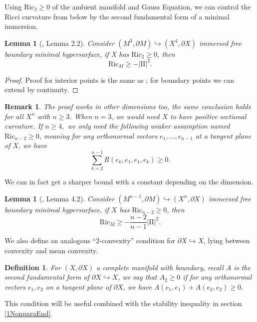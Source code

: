 \documentclass[12pt]{amsart}
\newcommand{\sff}{\mathrm{I\!I}}
\newcommand{\Ric}{\text{Ric}}
\newcommand{\p}{\partial}
\newtheorem{lemma}[theorem]{Lemma}
\newtheorem{definition}[theorem]{Definition}
\newtheorem{remark}[theorem]{Remark}
\numberwithin{equation}{section}
\begin{document}
	Using $\Ric_2 \geq 0$ of the ambient manifold and Gauss Equation, we can control the Ricci curvature from below by the second fundamental form of a minimal immersion.
	\begin{lemma}[\cite{ChodoLiStryk2022-CompleteStableMinimal}, Lemma 2.2] \label{RicXtoM}
        Consider $(M^3,\p M) \hookrightarrow (X^4,\p X)$ immersed free boundary minimal hypersurface, if X has $\Ric_2 \geq 0$, then
		\begin{equation}
			\Ric_M \geq -|\sff|^2.
		\end{equation}
	\end{lemma}
   

	\begin{proof}
		Proof for interior points is the same as \cite{ChodoLiStryk2022-CompleteStableMinimal}; for boundary points we can extend by continuity.
	\end{proof}
	\begin{remark}
        The proof works in other dimensions too, the same conclusion holds for all $X^n$ with $n\geq 3$. When $n=3$, we would need $X$ to have positive sectional curvature. If $n\geq 4,$ we only need the following weaker assumption named $\Ric_{n-2}\geq 0$, meaning for any orthonormal vectors $e_1,...,e_{n-1}$ at a tangent plane of $X$, we have $$\sum_{k=2}^{n-1} R(e_k,e_1,e_1,e_k)\geq 0.$$
    \end{remark}

	We can in fact get a sharper bound with a constant depending on the dimension.
    

    \begin{lemma} [\cite{ChodoLiStryk2022-CompleteStableMinimal}, Lemma 4.2]   \label{RicXtoM2}
        Consider $(M^{n-1}, \p M) \hookrightarrow (X^n,\p X)$ immersed free boundary minimal  hypersurface, if $X$ has $\Ric_{n-2} \geq 0$, then
		\begin{equation}
			\Ric_M \geq -\frac{n-2}{n-1}|\sff|^2.
		\end{equation}
	\end{lemma}

	

	We also define an analogous ``2-convexity'' condition for $\partial X \hookrightarrow X$, lying between convexity and mean convexity.
	\begin{definition}
		For $(X,\partial X)$ a complete manifold with boundary, recall $A$ is the second fundamental form of $\partial X \hookrightarrow X$, we say that $A_2 \geq 0$ if for any orthonormal vectors $e_1, e_2$ on a tangent plane of $\p X$, we have $A(e_1,e_1)+A(e_2,e_2) \geq 0$.
	\end{definition}
    This condition will be useful combined with the stability inequality in section \ref{1NonparaEnd}.
\end{document}
